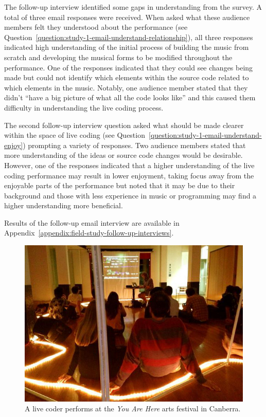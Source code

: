 The follow-up interview identified some gaps in understanding from the survey. A total of three email responses were received. When asked what these audience members felt they understood about the performance (see Question~\ref{question:study-1-email-understand-relationship}), all three responses indicated high understanding of the initial process of building the music from scratch and developing the musical forms to be modified throughout the performance. One of the responses indicated that they could see changes being made but could not identify which elements within the source code related to which elements in the music. Notably, one audience member stated that they didn't ``have a big picture of what all the code looks like'' and this caused them difficulty in understanding the live coding process. 

The second follow-up interview question asked what should be made clearer within the space of live coding (see Question~\ref{question:study-1-email-understand-enjoy}) prompting a variety of responses. Two audience members stated that more understanding of the ideas or source code changes would be desirable. However, one of the responses indicated that a higher understanding of the live coding performance may result in lower enjoyment, taking focus away from the enjoyable parts of the performance but noted that it may be due to their background and those with less experience in music or programming may find a higher understanding more beneficial.

Results of the follow-up email interview are available in Appendix~\ref{appendix:field-study-follow-up-interviews}.

\begin{figure}
\centering
\includegraphics[width=\textwidth]{../images/study-1-you-are-here.jpg}
\caption[\textit{You Are Here} live coding performance]{A live coder performs at the \textit{You Are Here} arts festival in Canberra.}
\label{fig:you-are-here-performance}
\end{figure}

